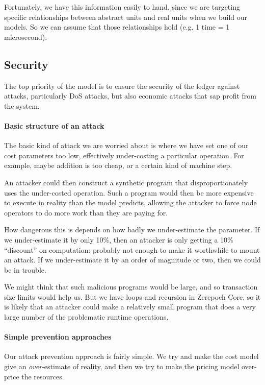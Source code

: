 Fortunately, we have this information easily to hand, since we are targeting specific relationships between abstract units and real units when we build our models.
So we can assume that those relationships hold (e.g. 1 \gls{time} = 1 microsecond).

\subsection{Security}
\label{sec:costing-security}

The top priority of the model is to ensure the security of the ledger against attacks, particularly DoS attacks, but also economic attacks that sap profit from the system.

\paragraph{Basic structure of an attack}
The basic kind of attack we are worried about is where we have set one of our cost parameters too low, effectively under-costing a particular operation.
For example, maybe addition is too cheap, or a certain kind of machine step.

An attacker could then construct a synthetic program that disproportionately uses the under-costed operation.
Such a program would then be more expensive to execute in reality than the model predicts, allowing the attacker to force node operators to do more work than they are paying for.

How dangerous this is depends on how badly we under-estimate the parameter.
If we under-estimate it by only 10\%, then an attacker is only getting a 10\% ``discount'' on computation: probably not enough to make it worthwhile to mount an attack.
If we under-estimate it by an order of magnitude or two, then we could be in trouble.

We might think that such malicious programs would be large, and so transaction size limits would help us.
But we have loops and recursion in Zerepoch Core, so it is likely that an attacker could make a relatively small program that does a very large number of the problematic runtime operations.

\paragraph{Simple prevention approaches}
Our attack prevention approach is fairly simple.
We try and make the cost model give an \emph{over}-estimate of reality, and then we try to make the pricing model over-price the resources.

